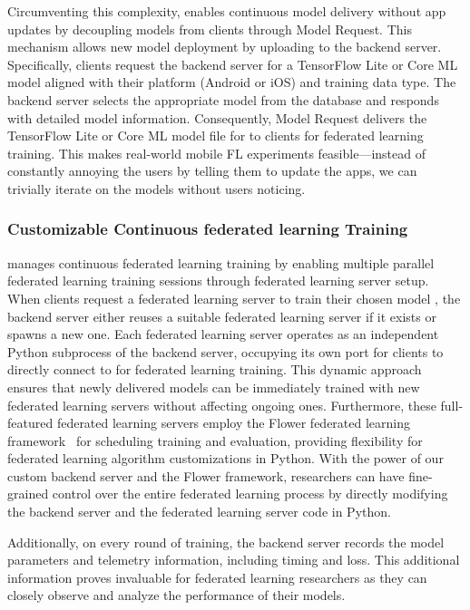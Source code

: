 Circumventing this complexity,
\fedkit enables continuous model delivery without app updates by decoupling
models from clients through Model Request. This mechanism allows new model
deployment by uploading to the backend server. Specifically,
clients request the backend server for a TensorFlow Lite or Core ML model
aligned with their platform (Android or iOS) and training data type.
The backend server selects the appropriate model \model{}
from the database and responds with detailed model information. Consequently,
Model Request delivers the TensorFlow Lite or Core ML model file for \model{}
to clients for federated learning training.
This makes real-world mobile FL experiments feasible---instead of constantly
annoying the users by telling them to update the apps,
we can trivially iterate on the models without users noticing.

\subsubsection{Customizable Continuous federated learning Training}
\fedkit manages continuous federated learning training by enabling multiple
parallel federated learning training sessions through federated learning server
setup.
When clients request a federated learning server to train their chosen model
\model{},
the backend server either reuses a suitable federated learning server \fs{}
if it exists or spawns a new one.
Each federated learning server operates as an independent Python subprocess of
the backend server,
occupying its own port for clients to directly connect to for federated learning
training.
This dynamic approach ensures that newly delivered models can be immediately
trained with new federated learning servers without affecting ongoing ones.
Furthermore,
these full-featured federated learning servers employ the Flower federated
learning framework~\cite{beutel2020flower}
for scheduling training and evaluation,
providing flexibility for federated learning algorithm customizations in Python.
With the power of our custom backend server and the Flower framework,
researchers can have fine-grained control over the entire federated learning
process by directly modifying the backend server and the federated learning
server code in Python.

Additionally, on every round of training,
the backend server records the model parameters and telemetry information,
including timing and loss.
This additional information proves invaluable for federated learning researchers
as they can closely observe and analyze the performance of their models.

